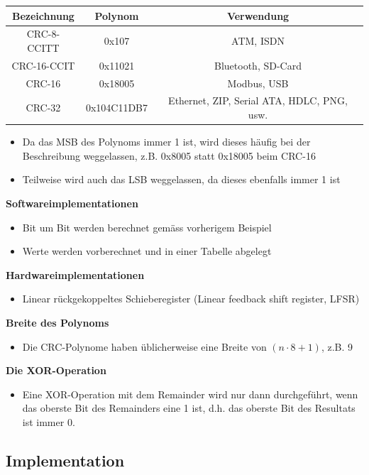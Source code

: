\begin{tabular}{|c|c|c|}
\hline \textbf{Bezeichnung} & \textbf{Polynom} & \textbf{Verwendung} \\ 
\hline CRC-8-CCITT & 0x107 &  ATM, ISDN\\ 
\hline CRC-16-CCIT & 0x11021 & Bluetooth, SD-Card \\ 
\hline  CRC-16 & 0x18005  &  Modbus, USB\\
\hline  CRC-32 & 0x104C11DB7 & Ethernet, ZIP, Serial ATA, HDLC, PNG, usw. \\
\hline 
\end{tabular} 

\begin{itemize}
	\item Da das MSB des Polynoms immer 1 ist, wird dieses häufig bei der Beschreibung weggelassen, z.B. 0x8005 statt 0x18005 beim CRC-16
	\item Teilweise wird auch das LSB weggelassen, da dieses ebenfalls immer 1 ist	
\end{itemize}

\textbf{Softwareimplementationen}
\begin{itemize}
	\item Bit um Bit werden berechnet gemäss vorherigem Beispiel
	\item Werte werden vorberechnet und in einer Tabelle abgelegt	
\end{itemize}

\textbf{Hardwareimplementationen}
\begin{itemize}
	\item Linear rückgekoppeltes Schieberegister (Linear feedback shift register, LFSR)	
\end{itemize}

\textbf{Breite des Polynoms}
\begin{itemize}
	\item Die CRC-Polynome haben üblicherweise eine Breite von $(n \cdot 8 + 1)$, z.B. 9		
\end{itemize}

\textbf{Die XOR-Operation}
\begin{itemize}
	\item Eine XOR-Operation mit dem Remainder wird nur dann durchgeführt, wenn
	das oberste Bit des Remainders eine 1 ist, d.h. das oberste Bit des Resultats ist
	immer 0.
\end{itemize}

\subsection{Implementation}

